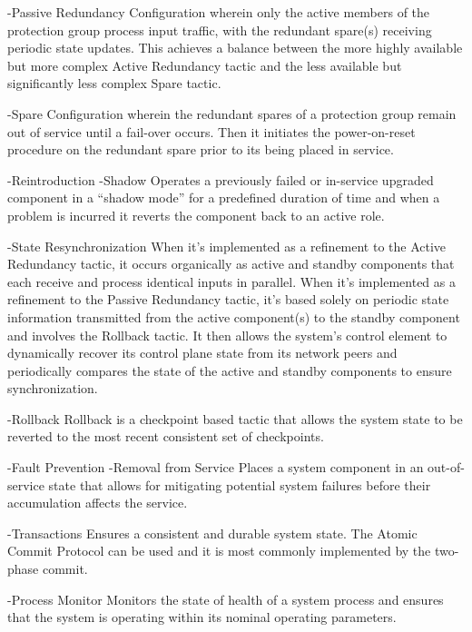 			-Passive Redundancy
				Configuration wherein only the active members of the protection group process input traffic, with the redundant spare(s) receiving periodic state updates. This achieves a balance between the more highly available but more complex Active Redundancy tactic and the less available but significantly less complex Spare tactic.
			
			-Spare
				Configuration wherein the redundant spares of a protection group remain out of service until a fail-over occurs. Then it initiates the power-on-reset procedure on the redundant spare prior to its being placed in service.
			
		-Reintroduction
			-Shadow
				Operates a previously failed or in-service upgraded component in a “shadow mode” for a predefined duration of time and when a problem is incurred it reverts the component back to an active role.
			
			-State Resynchronization 
				When it's implemented as a refinement to the Active Redundancy tactic, it occurs organically as active and standby components that each receive and process identical inputs in parallel.
				When it's implemented as a refinement to the Passive Redundancy tactic, it's based solely on periodic state information transmitted from the active component(s) to the standby component and involves the Rollback tactic.
				It then allows the system's control element to dynamically recover its control plane state from its network peers and periodically compares the state of the active and standby components to ensure synchronization.
			
			-Rollback
				Rollback is a checkpoint based tactic that allows the system state to be reverted to the most recent consistent set of checkpoints.
			
	-Fault Prevention
		-Removal from Service
			Places a system component in an out-of-service state that allows for mitigating potential system failures before their accumulation affects the service.
		
		-Transactions
			Ensures a consistent and durable system state. The Atomic Commit Protocol can be used and it is most commonly implemented by the two-phase commit.
		
		-Process Monitor
			Monitors the state of health of a system process and ensures that the system is operating within its nominal operating parameters.
		

